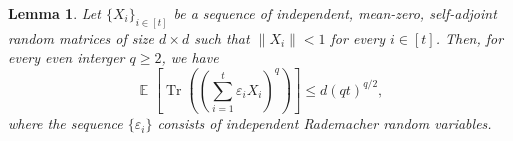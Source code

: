 \documentclass[10pt,a4paper]{article}
\newtheorem{lemma}[theorem]{Lemma}
\DeclareMathOperator*{\E}{\mathbb{E}}
\DeclareMathOperator*{\Tr}{Tr}
\newcommand{\eps}{\varepsilon}
\newcommand{\1}{\mathbbm{1}}
\newcommand{\norm}[1]{\left\lVert #1\right\rVert}
\newcommand{\tuple}[1]{\left(#1\right)}
\newcommand{\Ex}[2][]{\E_{#1}\left[#2\right]}
\begin{document}


\begin{lemma}
\label{lem:bound_with_Rad}
Let $\{X_i\}_{i \in [t]}$ be a sequence of independent, mean-zero, self-adjoint random matrices of size $d \times d$ such that $\|X_i\| < 1$ for every $i \in [t]$. Then, for every even interger $q \ge 2$, we have
\[
    \Ex{\Tr \tuple{\tuple{\sum_{i=1}^t \eps_i X_i}^q}} \le d (qt)^{q / 2},
\]
where the sequence $\{\eps_i\}$ consists of independent Rademacher random variables. 
\end{lemma}
\end{document}

